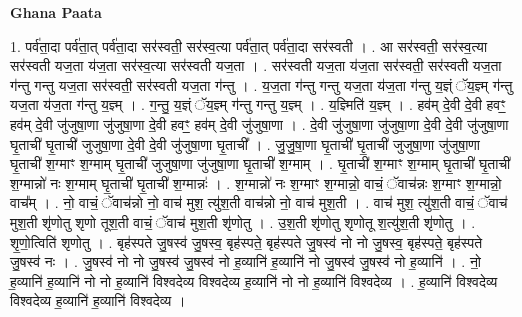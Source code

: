\documentclass[17pt]{extarticle}
\begin{document}
\textbf{Ghana Paata } \newline

1. पर्व॑ता॒दा पर्व॑ता॒त् पर्व॑ता॒दा सर॑स्वती॒ सर॑स्व॒त्या पर्व॑ता॒त् पर्व॑ता॒दा सर॑स्वती । . आ सर॑स्वती॒ सर॑स्व॒त्या सर॑स्वती यज॒ता य॑ज॒ता सर॑स्व॒त्या सर॑स्वती यज॒ता । . सर॑स्वती यज॒ता य॑ज॒ता सर॑स्वती॒ सर॑स्वती यज॒ता ग॑न्तु गन्तु यज॒ता सर॑स्वती॒ सर॑स्वती यज॒ता ग॑न्तु । . य॒ज॒ता ग॑न्तु गन्तु यज॒ता य॑ज॒ता ग॑न्तु य॒ज्ञ्ं ॅय॒ज्ञ्म् ग॑न्तु यज॒ता य॑ज॒ता ग॑न्तु य॒ज्ञ्म् । . ग॒न्तु॒ य॒ज्ञ्ं ॅय॒ज्ञ्म् ग॑न्तु गन्तु य॒ज्ञ्म् । . य॒ज्ञ्मिति॑ य॒ज्ञ्म् । . हव॑म् दे॒वी दे॒वी हवꣳ॒॒ हव॑म् दे॒वी जु॑जुषा॒णा जु॑जुषा॒णा दे॒वी हवꣳ॒॒ हव॑म् दे॒वी जु॑जुषा॒णा । . दे॒वी जु॑जुषा॒णा जु॑जुषा॒णा दे॒वी दे॒वी जु॑जुषा॒णा घृ॒ताची॑ घृ॒ताची॑ जुजुषा॒णा दे॒वी दे॒वी जु॑जुषा॒णा घृ॒ताची᳚ । . जु॒जु॒षा॒णा घृ॒ताची॑ घृ॒ताची॑ जुजुषा॒णा जु॑जुषा॒णा घृ॒ताची॑ श॒ग्माꣳ श॒ग्माम् घृ॒ताची॑ जुजुषा॒णा जु॑जुषा॒णा घृ॒ताची॑ श॒ग्माम् । . घृ॒ताची॑ श॒ग्माꣳ श॒ग्माम् घृ॒ताची॑ घृ॒ताची॑ श॒ग्मान्नो॑ नः श॒ग्माम् घृ॒ताची॑ घृ॒ताची॑ श॒ग्मान्नः॑ । . श॒ग्मान्नो॑ नः श॒ग्माꣳ श॒ग्मान्नो॒ वाचं॒ ॅवाच॑न्नः श॒ग्माꣳ श॒ग्मान्नो॒ वाच᳚म् । . नो॒ वाचं॒ ॅवाच॑न्नो नो॒ वाच॑ मुश॒ त्यु॑श॒ती वाच॑न्नो नो॒ वाच॑ मुश॒ती । . वाच॑ मुश॒ त्यु॑श॒ती वाचं॒ ॅवाच॑ मुश॒ती शृ॑णोतु शृणो तूश॒ती वाचं॒ ॅवाच॑ मुश॒ती शृ॑णोतु । . उ॒श॒ती शृ॑णोतु शृणोतू श॒त्यु॑श॒ती शृ॑णोतु । . शृ॒णो॒त्विति॑ शृणोतु । . बृह॑स्पते जु॒षस्व॑ जु॒षस्व॒ बृह॑स्पते॒ बृह॑स्पते जु॒षस्व॑ नो नो जु॒षस्व॒ बृह॑स्पते॒ बृह॑स्पते जु॒षस्व॑ नः । . जु॒षस्व॑ नो नो जु॒षस्व॑ जु॒षस्व॑ नो ह॒व्यानि॑ ह॒व्यानि॑ नो जु॒षस्व॑ जु॒षस्व॑ नो ह॒व्यानि॑ । . नो॒ ह॒व्यानि॑ ह॒व्यानि॑ नो नो ह॒व्यानि॑ विश्वदेव्य विश्वदेव्य ह॒व्यानि॑ नो नो ह॒व्यानि॑ विश्वदेव्य । . ह॒व्यानि॑ विश्वदेव्य विश्वदेव्य ह॒व्यानि॑ ह॒व्यानि॑ विश्वदेव्य । \newline
\end{document}
